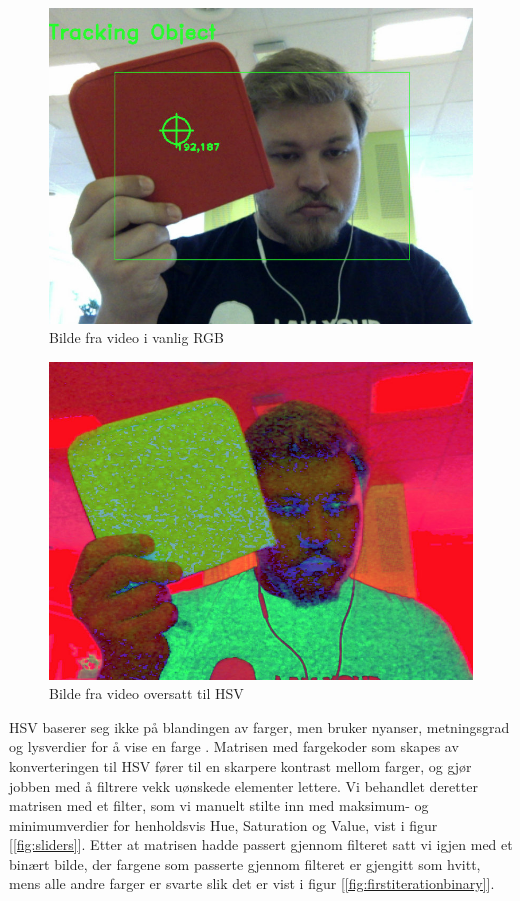 \begin{figure}[h!]
	\centering
	\includegraphics[scale=0.45]{img/first-rgb.jpg}
	\caption[Første iterasjon RGB bilde]{Bilde fra video i vanlig RGB}
	\label{fig:firstiterationrgb}
\end{figure}

\begin{figure}[h!]
	\centering
	\includegraphics[scale=0.45]{img/first-hsv.jpg}
	\caption[Første iterasjon HSV bilde]{Bilde fra video oversatt til HSV}
	\label{fig:firstiterationhsv}
\end{figure}

HSV baserer seg ikke på blandingen av farger, men bruker nyanser, metningsgrad og lysverdier for å vise en farge . Matrisen med fargekoder som skapes av konverteringen til HSV fører til en skarpere kontrast mellom farger, og gjør jobben med å filtrere vekk uønskede elementer lettere. Vi behandlet deretter matrisen med et filter, som vi manuelt stilte inn med maksimum- og minimumverdier for henholdsvis Hue, Saturation og Value, vist i figur [\ref{fig:sliders}]. Etter at matrisen hadde passert gjennom filteret satt vi igjen med et binært bilde, der fargene som passerte gjennom filteret er gjengitt som hvitt, mens alle andre farger er svarte slik det er vist i figur [\ref{fig:firstiterationbinary}].

